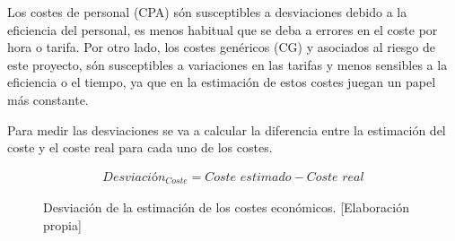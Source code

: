 Los costes de personal (CPA) són susceptibles a desviaciones debido a la eficiencia del personal, es menos
habitual que se deba a errores en el coste por hora o tarifa. Por otro lado, los costes genéricos (CG) y asociados
al riesgo de este proyecto, són susceptibles a variaciones en las tarifas y menos sensibles a la eficiencia o el
tiempo, ya que en la estimación de estos costes juegan un papel más constante.

Para medir las desviaciones se va a calcular la diferencia entre la estimación
del coste y el coste real para cada uno de los costes.
\begin{figure}[H]
    \begin{align*}
        \textit{Desviación}_{\textit{Coste}} = \textit{Coste estimado} - \textit{Coste real}
    \end{align*}
    \caption{Desviación de la estimación de los costes económicos.  [Elaboración propia]}
\end{figure}



